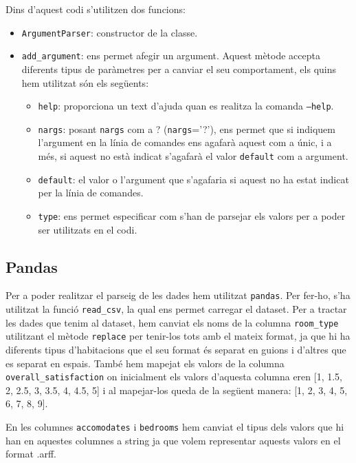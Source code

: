 \documentclass[../informe.tex]{subfiles}
\begin{document}
    Dins d'aquest codi s'utilitzen dos funcions:
    \begin{itemize}
        \item \texttt{ArgumentParser}: constructor de la classe.
        \item \texttt{add\_argument}: ens permet afegir un argument. Aquest mètode accepta diferents tipus de paràmetres per a canviar el seu comportament, els quins hem utilitzat són els següents:
        \begin{itemize}
            \item \texttt{help}: proporciona un text d'ajuda quan es realitza la comanda \texttt{--help}.
            \item \texttt{nargs}: posant \texttt{nargs} com a ? (\texttt{nargs}='?'), ens permet que si indiquem l'argument en la línia de comandes ens agafarà aquest com a únic, i a més, si aquest no està indicat s'agafarà el valor \texttt{default} com a argument.
            \item \texttt{default}: el valor o l'argument que s'agafaria si aquest no ha estat indicat per la línia de comandes.
            \item \texttt{type}: ens permet especificar com s'han de parsejar els valors per a poder ser utilitzats en el codi.
        \end{itemize}
    \end{itemize}

    \subsection{Pandas}
    Per a poder realitzar el parseig de les dades hem utilitzat \texttt{pandas}. Per fer-ho, s'ha utilitzat la funció \texttt{read\_csv}, la qual ens permet carregar el dataset. Per a tractar les dades que tenim al dataset, hem canviat els noms de la columna \texttt{room\_type} utilitzant el mètode \texttt{replace} per tenir-los tots amb el mateix format, ja que hi ha diferents tipus d'habitacions que el seu format és separat en guions i d'altres que es separat en espais. També hem mapejat els valors de la columna \texttt{overall\_satisfaction} on inicialment els valors d'aquesta columna eren [1, 1.5, 2, 2.5, 3, 3.5, 4, 4.5, 5] i al mapejar-los queda de la següent manera: [1, 2, 3, 4, 5, 6, 7, 8, 9].

    \medskip
    En les columnes \texttt{accomodates} i \texttt{bedrooms} hem canviat el tipus dels valors que hi han en aquestes columnes a string ja que volem representar aquests valors en el format .arff.
\end{document}
